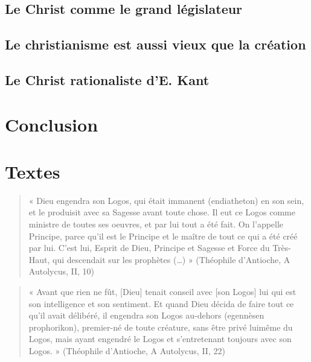 \subsection{Le Christ comme le grand législateur}
 
\subsection{Le christianisme est aussi vieux que la création}
 
\subsection{Le Christ rationaliste d’E. Kant}
 
\section{Conclusion}


\section{Textes}





\begin{quote}
    « Dieu engendra son Logos, qui était immanent (endiatheton) en son sein, et le produisit avec
sa Sagesse avant toute chose. Il eut ce Logos comme ministre de toutes ses oeuvres, et par lui
tout a été fait. On l’appelle Principe, parce qu’il est le Principe et le maître de tout ce qui a été
créé par lui. C’est lui, Esprit de Dieu, Principe et Sagesse et Force du Très-Haut, qui
descendait sur les prophètes (…) » (Théophile d’Antioche, A Autolycus, II, 10)
\end{quote}


\begin{quote}
    « Avant que rien ne fût, [Dieu] tenait conseil avec [son Logos] lui qui est son intelligence et
son sentiment. Et quand Dieu décida de faire tout ce qu’il avait délibéré, il engendra son
Logos au-dehors (egennèsen prophorikon), premier-né de toute créature, sans être privé luimême
du Logos, mais ayant engendré le Logos et s’entretenant toujours avec son Logos. »
(Théophile d’Antioche, A Autolycus, II, 22)
\end{quote}



 










